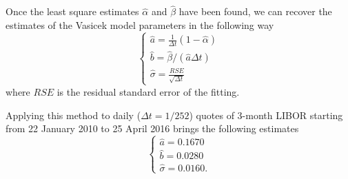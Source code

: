 Once the least square estimates $\widehat{\alpha}$ and $\widehat{\beta}$ have been found, we can recover the estimates of the Vasicek model parameters in the following way
\begin{equation*}
\begin{cases*}
\widehat{a}=\frac{1}{\Delta t}(1-\widehat{\alpha})\\[2ex]
\widehat{b}= \widehat{\beta}/(\widehat{a}\Delta t)\\[2ex]
\widehat{\sigma}=\frac{RSE}{\sqrt{\Delta t}}
\end{cases*}
\end{equation*}
where $RSE$ is the residual standard error of the fitting.

Applying this method to daily ($\Delta t = 1/252$) quotes of 3-month LIBOR starting from 22 January 2010 to 25 April 2016 brings the following estimates
\begin{equation*}
\begin{cases*}
\widehat{a}=0.1670\\
\widehat{b}=0.0280 \\
\widehat{\sigma}=0.0160.
\end{cases*}
\end{equation*}






